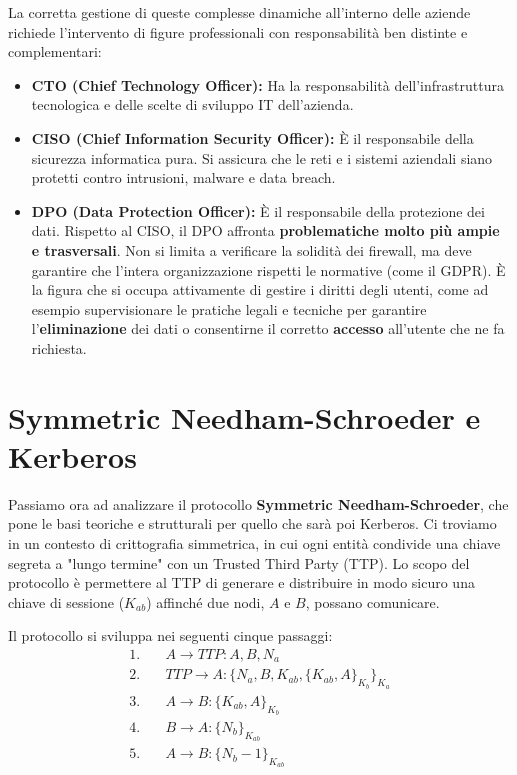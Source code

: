 La corretta gestione di queste complesse dinamiche all'interno delle aziende richiede l'intervento di figure professionali con responsabilità ben distinte e complementari:
\begin{itemize}
    \item \textbf{CTO (Chief Technology Officer):} Ha la responsabilità dell'infrastruttura tecnologica e delle scelte di sviluppo IT dell'azienda.
    \item \textbf{CISO (Chief Information Security Officer):} È il responsabile della sicurezza informatica pura. Si assicura che le reti e i sistemi aziendali siano protetti contro intrusioni, malware e data breach.
    \item \textbf{DPO (Data Protection Officer):} È il responsabile della protezione dei dati. Rispetto al CISO, il DPO affronta \textbf{problematiche molto più ampie e trasversali}. Non si limita a verificare la solidità dei firewall, ma deve garantire che l'intera organizzazione rispetti le normative (come il GDPR). È la figura che si occupa attivamente di gestire i diritti degli utenti, come ad esempio supervisionare le pratiche legali e tecniche per garantire l'\textbf{eliminazione} dei dati o consentirne il corretto \textbf{accesso} all'utente che ne fa richiesta.
\end{itemize}

\chapter{Symmetric Needham-Schroeder e Kerberos}
Passiamo ora ad analizzare il protocollo \textbf{Symmetric Needham-Schroeder}, che pone le basi teoriche e strutturali per quello che sarà poi Kerberos. Ci troviamo in un contesto di crittografia simmetrica, in cui ogni entità condivide una chiave segreta a "lungo termine" con un Trusted Third Party (TTP). Lo scopo del protocollo è permettere al TTP di generare e distribuire in modo sicuro una chiave di sessione ($K_{ab}$) affinché due nodi, $A$ e $B$, possano comunicare.

Il protocollo si sviluppa nei seguenti cinque passaggi:
\begin{align*}
    1.\quad & A \rightarrow TTP : A, B, N_a \\
    2.\quad & TTP \rightarrow A : \{N_a, B, K_{ab}, \{K_{ab}, A\}_{K_b}\}_{K_a} \\
    3.\quad & A \rightarrow B : \{K_{ab}, A\}_{K_b} \\
    4.\quad & B \rightarrow A : \{N_b\}_{K_{ab}} \\
    5.\quad & A \rightarrow B : \{N_b - 1\}_{K_{ab}}
\end{align*}

